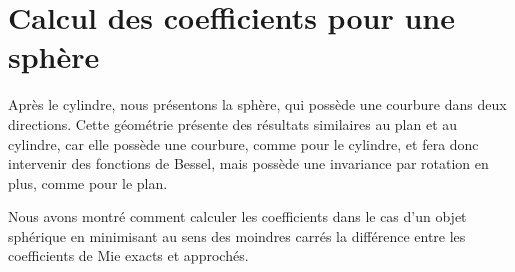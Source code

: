 \chapter{Calcul des coefficients pour une sphère}
\label{sec:sphere}
\minitoc
\newpage
{}
Après le cylindre, nous présentons la sphère, qui possède une courbure dans deux directions. Cette géométrie présente des résultats similaires au plan et au cylindre, car elle possède une courbure, comme pour le cylindre, et fera donc intervenir des fonctions de Bessel, mais possède une invariance par rotation en plus, comme pour le plan.







Nous avons montré comment calculer les coefficients dans le cas d'un objet sphérique en minimisant au sens des moindres carrés la différence entre les coefficients de Mie exacts et approchés. 
